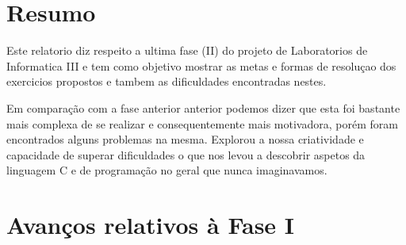 \documentclass[12pt,a4paper]{article}
\begin{document}
\renewcommand{\contentsname}{Índice}

\tableofcontents

\pagebreak

\section{Resumo}
    \par Este relatorio diz respeito a ultima fase (II) do projeto de Laboratorios de Informatica III e tem como objetivo mostrar as metas e formas de resoluçao dos exercicios propostos e tambem as dificuldades encontradas nestes.
    \par Em comparação com a fase anterior anterior podemos dizer que esta foi bastante mais complexa de se realizar e consequentemente mais motivadora, porém foram encontrados alguns problemas na mesma. Explorou a nossa criatividade e capacidade de superar dificuldades o que nos levou a descobrir aspetos da linguagem C e de programação no geral que nunca imaginavamos.

\clearpage

\section{Avanços relativos à Fase I}
\end{document}
